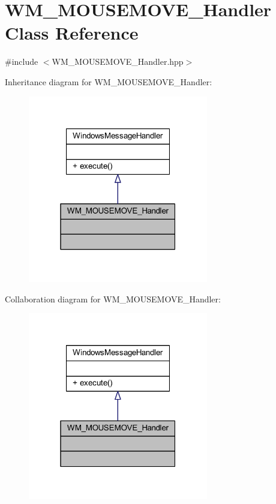 \hypertarget{class_w_m___m_o_u_s_e_m_o_v_e___handler}{}\section{W\+M\+\_\+\+M\+O\+U\+S\+E\+M\+O\+V\+E\+\_\+\+Handler Class Reference}
\label{class_w_m___m_o_u_s_e_m_o_v_e___handler}


{\ttfamily \#include $<$W\+M\+\_\+\+M\+O\+U\+S\+E\+M\+O\+V\+E\+\_\+\+Handler.\+hpp$>$}



Inheritance diagram for W\+M\+\_\+\+M\+O\+U\+S\+E\+M\+O\+V\+E\+\_\+\+Handler\+:\nopagebreak
\begin{figure}[H]
\begin{center}
\leavevmode
\includegraphics[width=223pt]{class_w_m___m_o_u_s_e_m_o_v_e___handler__inherit__graph}
\end{center}
\end{figure}


Collaboration diagram for W\+M\+\_\+\+M\+O\+U\+S\+E\+M\+O\+V\+E\+\_\+\+Handler\+:\nopagebreak
\begin{figure}[H]
\begin{center}
\leavevmode
\includegraphics[width=223pt]{class_w_m___m_o_u_s_e_m_o_v_e___handler__coll__graph}
\end{center}
\end{figure}
